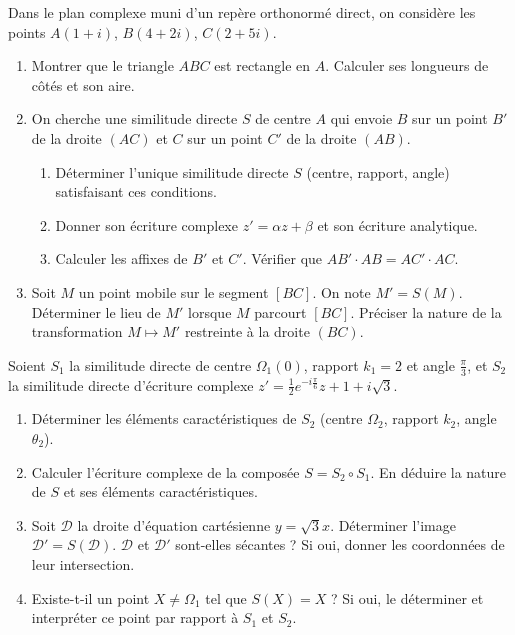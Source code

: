 \documentclass[11pt]{article}
\begin{document}
\begin{exercice}
Dans le plan complexe muni d'un repère orthonormé direct, on considère les points $A(1+i)$, $B(4+2i)$, $C(2+5i)$.
\begin{enumerate}
    \item Montrer que le triangle $ABC$ est rectangle en $A$. Calculer ses longueurs de côtés et son aire.
    \item On cherche une similitude directe $S$ de centre $A$ qui envoie $B$ sur un point $B'$ de la droite $(AC)$ et $C$ sur un point $C'$ de la droite $(AB)$.
    \begin{enumerate}
        \item Déterminer l'unique similitude directe $S$ (centre, rapport, angle) satisfaisant ces conditions.
        \item Donner son écriture complexe $z' = \alpha z + \beta$ et son écriture analytique.
        \item Calculer les affixes de $B'$ et $C'$. Vérifier que $AB' \cdot AB = AC' \cdot AC$.
    \end{enumerate}
    \item Soit $M$ un point mobile sur le segment $[BC]$. On note $M' = S(M)$. Déterminer le lieu de $M'$ lorsque $M$ parcourt $[BC]$. Préciser la nature de la transformation $M \mapsto M'$ restreinte à la droite $(BC)$.
\end{enumerate}
\end{exercice}

\begin{exercice}
Soient $S_1$ la similitude directe de centre $\Omega_1(0)$, rapport $k_1=2$ et angle $\frac{\pi}{3}$, et $S_2$ la similitude directe d'écriture complexe $z' = \frac{1}{2}e^{-i\frac{\pi}{6}}z + 1+i\sqrt{3}$.
\begin{enumerate}
    \item Déterminer les éléments caractéristiques de $S_2$ (centre $\Omega_2$, rapport $k_2$, angle $\theta_2$).
    \item Calculer l'écriture complexe de la composée $S = S_2 \circ S_1$. En déduire la nature de $S$ et ses éléments caractéristiques.
    \item Soit $\mathcal{D}$ la droite d'équation cartésienne $y = \sqrt{3}x$. Déterminer l'image $\mathcal{D}' = S(\mathcal{D})$. $\mathcal{D}$ et $\mathcal{D}'$ sont-elles sécantes ? Si oui, donner les coordonnées de leur intersection.
    \item Existe-t-il un point $X \neq \Omega_1$ tel que $S(X) = X$ ? Si oui, le déterminer et interpréter ce point par rapport à $S_1$ et $S_2$.
\end{enumerate}
\end{exercice}
\end{document}
